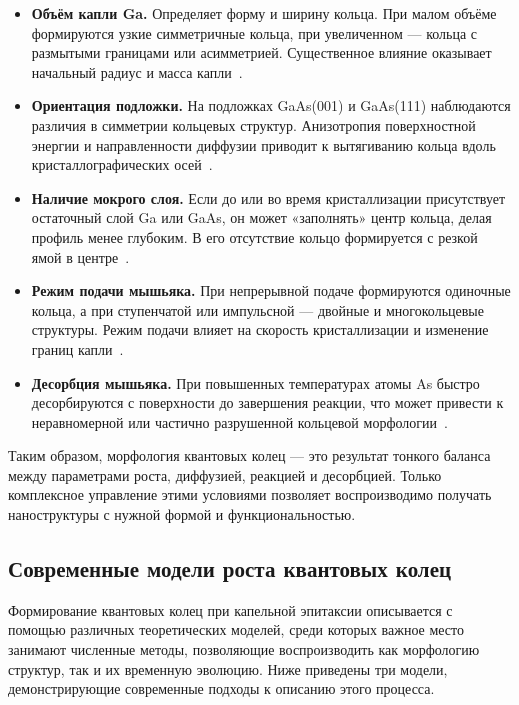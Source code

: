 \documentclass[14pt,oneside]{extarticle}
\begin{document}
\begin{itemize}
    \item \textbf{Объём капли Ga.} Определяет форму и ширину кольца. При малом объёме формируются узкие симметричные кольца, при увеличенном — кольца с размытыми границами или асимметрией. Существенное влияние оказывает начальный радиус и масса капли~\cite{zhou2013}.

    \item \textbf{Ориентация подложки.} На подложках GaAs(001) и GaAs(111) наблюдаются различия в симметрии кольцевых структур. Анизотропия поверхностной энергии и направленности диффузии приводит к вытягиванию кольца вдоль кристаллографических осей~\cite{elborg2017}.

    \item \textbf{Наличие мокрого слоя.} Если до или во время кристаллизации присутствует остаточный слой Ga или GaAs, он может «заполнять» центр кольца, делая профиль менее глубоким. В его отсутствие кольцо формируется с резкой ямой в центре~\cite{sibirmovskiy2014}.

    \item \textbf{Режим подачи мышьяка.} При непрерывной подаче формируются одиночные кольца, а при ступенчатой или импульсной — двойные и многокольцевые структуры. Режим подачи влияет на скорость кристаллизации и изменение границ капли~\cite{wang2022}.

    \item \textbf{Десорбция мышьяка.} При повышенных температурах атомы As быстро десорбируются с поверхности до завершения реакции, что может привести к неравномерной или частично разрушенной кольцевой морфологии~\cite{fan2023}.
\end{itemize}

Таким образом, морфология квантовых колец — это результат тонкого баланса между параметрами роста, диффузией, реакцией и десорбцией. Только комплексное управление этими условиями позволяет воспроизводимо получать наноструктуры с нужной формой и функциональностью.

\subsection{Современные модели роста квантовых колец}

Формирование квантовых колец при капельной эпитаксии описывается с помощью различных теоретических моделей, среди которых важное место занимают численные методы, позволяющие воспроизводить как морфологию структур, так и их временную эволюцию. Ниже приведены три модели, демонстрирующие современные подходы к описанию этого процесса.
\end{document}
